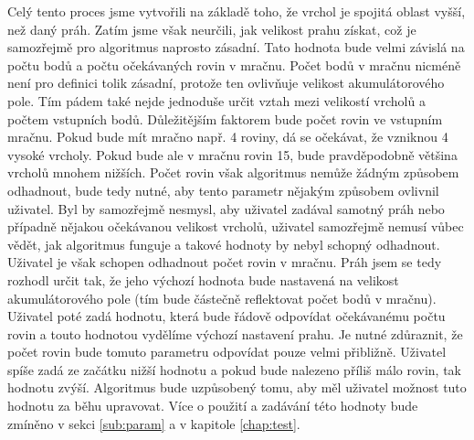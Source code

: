 \documentclass[11pt,twoside,a4paper]{book}
\begin{document}
Celý tento proces jsme vytvořili na základě toho, že vrchol je spojitá oblast vyšší, než daný práh. Zatím jsme však neurčili, jak velikost prahu získat, což je samozřejmě pro algoritmus naprosto zásadní. Tato hodnota bude velmi závislá na počtu bodů a počtu očekávaných rovin v mračnu. Počet bodů v mračnu nicméně není pro definici tolik zásadní, protože ten ovlivňuje velikost akumulátorového pole. Tím pádem také nejde jednoduše určit vztah mezi velikostí vrcholů a počtem vstupních bodů. Důležitějším faktorem bude počet rovin ve vstupním mračnu. Pokud bude mít mračno např. 4 roviny, dá se očekávat, že vzniknou 4 vysoké vrcholy. Pokud bude ale v mračnu rovin 15, bude pravděpodobně většina vrcholů mnohem nižších. Počet rovin však algoritmus nemůže žádným způsobem odhadnout, bude tedy nutné, aby tento parametr nějakým způsobem ovlivnil uživatel. Byl by samozřejmě nesmysl, aby uživatel zadával samotný práh nebo případně nějakou očekávanou velikost vrcholů, uživatel samozřejmě nemusí vůbec vědět, jak algoritmus funguje a takové hodnoty by nebyl schopný odhadnout. Uživatel je však schopen odhadnout počet rovin v mračnu. Práh jsem se tedy rozhodl určit tak, že jeho výchozí hodnota bude nastavená na velikost akumulátorového pole (tím bude částečně reflektovat počet bodů v mračnu). Uživatel poté zadá hodnotu, která bude řádově odpovídat očekávanému počtu rovin a touto hodnotou vydělíme výchozí nastavení prahu. Je nutné zdůraznit, že počet rovin bude tomuto parametru odpovídat pouze velmi přibližně. Uživatel spíše zadá ze začátku nižší hodnotu a pokud bude nalezeno příliš málo rovin, tak hodnotu zvýší. Algoritmus bude uzpůsobený tomu, aby měl uživatel možnost tuto hodnotu za běhu upravovat. Více o použití a zadávání této hodnoty bude zmíněno v sekci \ref{sub:param} a v kapitole \ref{chap:test}.
\end{document}
